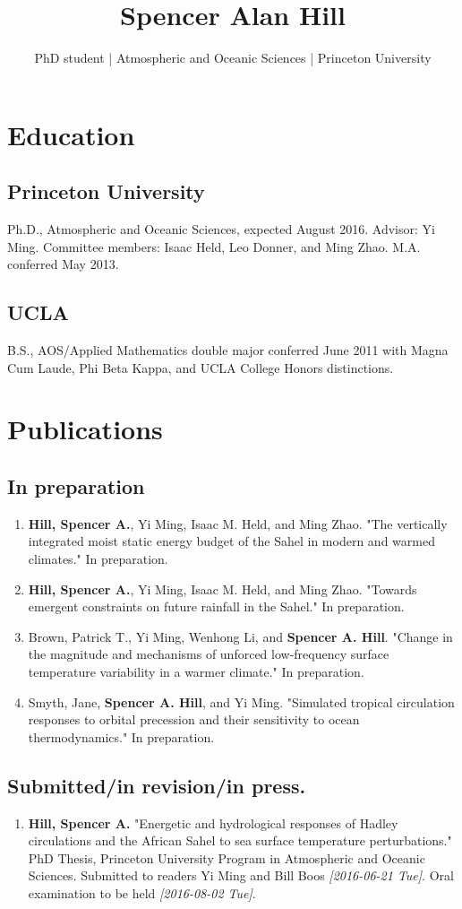 \documentclass{article}
\author{PhD student | Atmospheric and Oceanic Sciences | Princeton University}
\date{}
\title{Spencer Alan Hill}
\begin{document}
\maketitle
\section*{Education}
\label{sec:orgheadline3}
\subsection*{Princeton University}
\label{sec:orgheadline1}
Ph.D., Atmospheric and Oceanic Sciences, expected August 2016.  Advisor: Yi
Ming.  Committee members: Isaac Held, Leo Donner, and Ming Zhao.
M.A. conferred May 2013.
\subsection*{UCLA}
\label{sec:orgheadline2}
B.S., AOS/Applied Mathematics double major conferred June 2011 with
Magna Cum Laude, Phi Beta Kappa, and UCLA College Honors distinctions.
\section*{Publications}
\label{sec:orgheadline8}
\subsection*{In preparation}
\label{sec:orgheadline4}
\begin{enumerate}
\item \textbf{Hill, Spencer A.}, Yi Ming, Isaac M. Held, and Ming Zhao.  "The vertically
integrated moist static energy budget of the Sahel in modern and warmed
climates."  In preparation.
\item \textbf{Hill, Spencer A.}, Yi Ming, Isaac M. Held, and Ming Zhao.  "Towards emergent constraints on
future rainfall in the Sahel."  In preparation.
\item Brown, Patrick T., Yi Ming, Wenhong Li, and \textbf{Spencer A. Hill}.  "Change in the
magnitude and mechanisms of unforced low-frequency surface temperature
variability in a warmer climate."  In preparation.
\item Smyth, Jane, \textbf{Spencer A. Hill}, and Yi Ming.  "Simulated tropical circulation responses to
orbital precession and their sensitivity to ocean thermodynamics."  In
preparation.
\end{enumerate}
\subsection*{Submitted/in revision/in press.}
\label{sec:orgheadline5}
\begin{enumerate}
\item \textbf{Hill, Spencer A.} "Energetic and hydrological responses of Hadley circulations
and the African Sahel to sea surface temperature perturbations."  PhD Thesis,
Princeton University Program in Atmospheric and Oceanic Sciences.  Submitted
to readers Yi Ming and Bill Boos \textit{[2016-06-21 Tue]}.  Oral examination to be
held \textit{[2016-08-02 Tue]}.
\end{enumerate}
\end{document}
